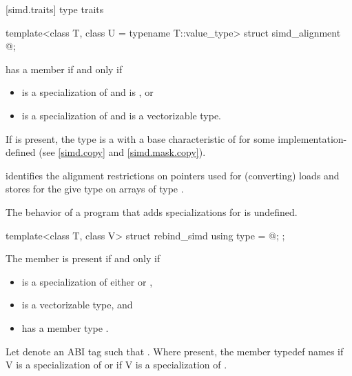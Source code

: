 [simd.traits]{ type traits}

\begin{itemdecl}
template<class T, class U = typename T::value_type> struct simd_alignment { @\seebelow@ };
\end{itemdecl}

\begin{itemdescr}
\pnum
{} has a member  if and only if
\begin{itemize}
  \item {} is a specialization of  and  is , or
  \item {} is a specialization of  and  is a vectorizable type.
\end{itemize}

\pnum
If  is present, the type  is a  with a base characteristic of  for some implementation-defined  (see \ref{simd.copy} and \ref{simd.mask.copy}). \begin{note} identifies the alignment restrictions on pointers used for (converting) loads and stores for the give type  on arrays of type .\end{note}

\pnum
The behavior of a program that adds specializations for  is undefined.
\end{itemdescr}

\begin{itemdecl}
template<class T, class V> struct rebind_simd { using type = @\seebelow@; };
\end{itemdecl}

\begin{itemdescr}
  \pnum
  The member  is present if and only if
  \begin{itemize}
    \item {} is a specialization of either  or
      ,
    \item {} is a vectorizable type, and
    \item {} has a member type .
  \end{itemize}

  \pnum
  Let  denote an ABI tag such that .
  Where present, the member typedef  names  if \tcode V is a specialization of  or
   if \tcode V is a specialization of
  .
\end{itemdescr}

